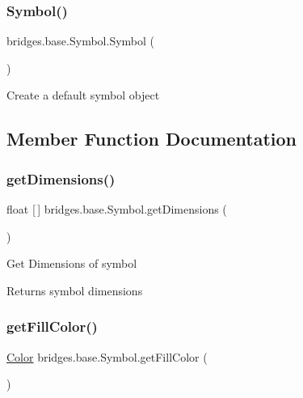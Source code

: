 \subsubsection{\texorpdfstring{Symbol()}{Symbol()}}
{\footnotesize\ttfamily bridges.\+base.\+Symbol.\+Symbol (\begin{DoxyParamCaption}{ }\end{DoxyParamCaption})}

Create a default symbol object 

\subsection{Member Function Documentation}
\mbox{\label{classbridges_1_1base_1_1_symbol_a6cf741f603dd6347325e95a2b4d13d2e}} 
\subsubsection{\texorpdfstring{get\+Dimensions()}{getDimensions()}}
{\footnotesize\ttfamily float \mbox{[}$\,$\mbox{]} bridges.\+base.\+Symbol.\+get\+Dimensions (\begin{DoxyParamCaption}{ }\end{DoxyParamCaption})}

Get Dimensions of symbol \begin{DoxyReturn}{Returns}
symbol dimensions 
\end{DoxyReturn}
\mbox{\label{classbridges_1_1base_1_1_symbol_aed2e531266c8a3bc563709c6486380cc}} 
\subsubsection{\texorpdfstring{get\+Fill\+Color()}{getFillColor()}}
{\footnotesize\ttfamily \mbox{\hyperlink{classbridges_1_1base_1_1_color}{Color}} bridges.\+base.\+Symbol.\+get\+Fill\+Color (\begin{DoxyParamCaption}{ }\end{DoxyParamCaption})}

